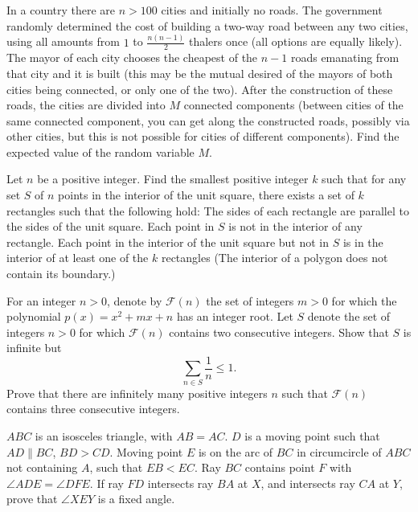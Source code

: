 \documentclass[11pt]{scrartcl}
\begin{document}
\begin{problem}[4118541811915047639]
	In a country there are $n>100$ cities and initially no roads. The government randomly determined the cost of building a two-way road between any two cities, using all amounts from $1$ to $\frac{n(n-1)}{2}$ thalers once (all options are equally likely). The mayor of each city chooses the cheapest of the $n-1$ roads emanating from that city and it is built (this may be the mutual desired of the mayors of both cities being connected, or only one of the two).
After the construction of these roads, the cities are divided into $M$ connected components (between cities of the same connected component, you can get along the constructed roads, possibly via other cities, but this is not possible for cities of different components). Find the expected value of the random variable $M$.
\end{problem}
\begin{problem}[792975361721939]
	Let $n$ be a positive integer. Find the smallest positive integer $k$ such that for any set $S$ of $n$ points in the interior of the unit square, there exists a set of $k$ rectangles such that the following hold:
The sides of each rectangle are parallel to the sides of the unit square.
Each point in $S$ is not in the interior of any rectangle.
Each point in the interior of the unit square but not in $S$ is in the interior of at least one of the $k$ rectangles
(The interior of a polygon does not contain its boundary.)
\end{problem}
\begin{problem}[69707766974981]
For an integer $n > 0$, denote by $\mathcal F(n)$ the set of integers $m > 0$ for which the polynomial $p(x) = x^2 + mx + n$ has an integer root.
Let $S$ denote the set of integers $n > 0$ for which $\mathcal F(n)$ contains two consecutive integers. Show that $S$ is infinite but\[ \sum_{n \in S} \frac 1n \le 1. \]
Prove that there are infinitely many positive integers $n$ such that $\mathcal F(n)$ contains three consecutive integers.
\end{problem}
\begin{problem}[215375559035207]
$ABC$ is an isosceles triangle, with $AB=AC$. $D$ is a moving point such that $AD\parallel BC$, $BD>CD$. Moving point $E$ is on the arc of $BC$ in circumcircle of $ABC$ not containing $A$, such that $EB<EC$. Ray $BC$ contains point $F$ with $\angle ADE=\angle DFE$. If ray $FD$ intersects ray $BA$ at $X$, and intersects ray $CA$ at $Y$, prove that $\angle XEY$ is a fixed angle.
\end{problem}
\end{document}
